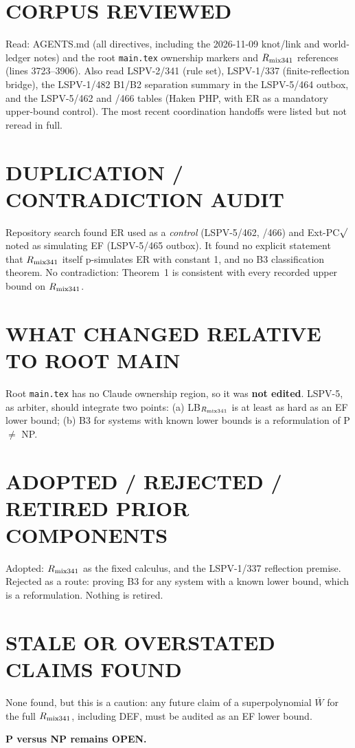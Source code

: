 \documentclass[11pt]{article}
\begin{document}
\section*{CORPUS REVIEWED}
Read: AGENTS.md (all directives, including the 2026-11-09 knot/link and world-ledger notes) and the root \texttt{main.tex} ownership markers and $R_{\rm mix341}$ references (lines 3723--3906). Also read LSPV-2/341 (rule set), LSPV-1/337 (finite-reflection bridge), the LSPV-1/482 B1/B2 separation summary in the LSPV-5/464 outbox, and the LSPV-5/462 and /466 tables (Haken PHP, with ER as a mandatory upper-bound control). The most recent coordination handoffs were listed but not reread in full.

\section*{DUPLICATION / CONTRADICTION AUDIT}
Repository search found ER used as a \emph{control} (LSPV-5/462, /466) and Ext-PC$\surd$ noted as simulating EF (LSPV-5/465 outbox). It found no explicit statement that $R_{\rm mix341}$ itself p-simulates ER with constant 1, and no B3 classification theorem. No contradiction: Theorem~1 is consistent with every recorded upper bound on $R_{\rm mix341}$.

\section*{WHAT CHANGED RELATIVE TO ROOT MAIN}
Root \texttt{main.tex} has no Claude ownership region, so it was \textbf{not edited}. LSPV-5, as arbiter, should integrate two points: (a) LB$_{R_{\rm mix341}}$ is at least as hard as an EF lower bound; (b) B3 for systems with known lower bounds is a reformulation of P $\neq$ NP.

\section*{ADOPTED / REJECTED / RETIRED PRIOR COMPONENTS}
Adopted: $R_{\rm mix341}$ as the fixed calculus, and the LSPV-1/337 reflection premise. Rejected as a route: proving B3 for any system with a known lower bound, which is a reformulation. Nothing is retired.

\section*{STALE OR OVERSTATED CLAIMS FOUND}
None found, but this is a caution: any future claim of a superpolynomial $\overline W$ for the full $R_{\rm mix341}$, including DEF, must be audited as an EF lower bound.

\noindent\textbf{P versus NP remains OPEN.}
\end{document}

